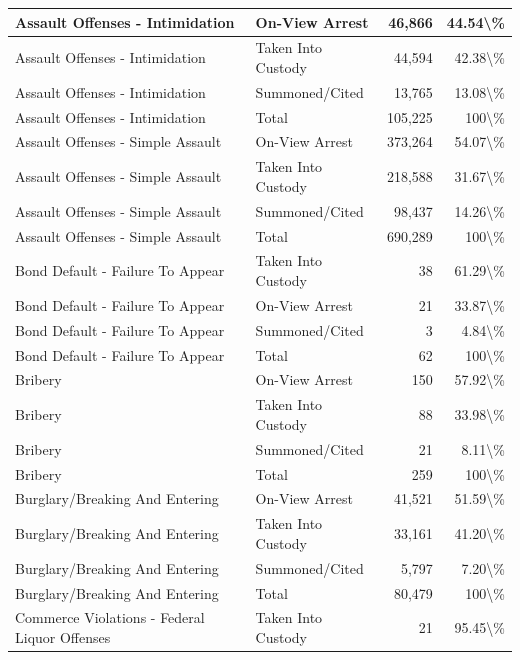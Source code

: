 \documentclass[
]{krantz}
\begin{document}
\begin{longtable}[t]{l|l|r|r}
\hline
Assault Offenses - Intimidation & On-View Arrest & 46,866 & 44.54\textbackslash{}\%\\
\hline
Assault Offenses - Intimidation & Taken Into Custody & 44,594 & 42.38\textbackslash{}\%\\
\hline
Assault Offenses - Intimidation & Summoned/Cited & 13,765 & 13.08\textbackslash{}\%\\
\hline
Assault Offenses - Intimidation & Total & 105,225 & 100\textbackslash{}\%\\
\hline
Assault Offenses - Simple Assault & On-View Arrest & 373,264 & 54.07\textbackslash{}\%\\
\hline
Assault Offenses - Simple Assault & Taken Into Custody & 218,588 & 31.67\textbackslash{}\%\\
\hline
Assault Offenses - Simple Assault & Summoned/Cited & 98,437 & 14.26\textbackslash{}\%\\
\hline
Assault Offenses - Simple Assault & Total & 690,289 & 100\textbackslash{}\%\\
\hline
Bond Default - Failure To Appear & Taken Into Custody & 38 & 61.29\textbackslash{}\%\\
\hline
Bond Default - Failure To Appear & On-View Arrest & 21 & 33.87\textbackslash{}\%\\
\hline
Bond Default - Failure To Appear & Summoned/Cited & 3 & 4.84\textbackslash{}\%\\
\hline
Bond Default - Failure To Appear & Total & 62 & 100\textbackslash{}\%\\
\hline
Bribery & On-View Arrest & 150 & 57.92\textbackslash{}\%\\
\hline
Bribery & Taken Into Custody & 88 & 33.98\textbackslash{}\%\\
\hline
Bribery & Summoned/Cited & 21 & 8.11\textbackslash{}\%\\
\hline
Bribery & Total & 259 & 100\textbackslash{}\%\\
\hline
Burglary/Breaking And Entering & On-View Arrest & 41,521 & 51.59\textbackslash{}\%\\
\hline
Burglary/Breaking And Entering & Taken Into Custody & 33,161 & 41.20\textbackslash{}\%\\
\hline
Burglary/Breaking And Entering & Summoned/Cited & 5,797 & 7.20\textbackslash{}\%\\
\hline
Burglary/Breaking And Entering & Total & 80,479 & 100\textbackslash{}\%\\
\hline
Commerce Violations - Federal Liquor Offenses & Taken Into Custody & 21 & 95.45\textbackslash{}\%\\

\end{longtable}
\end{document}
